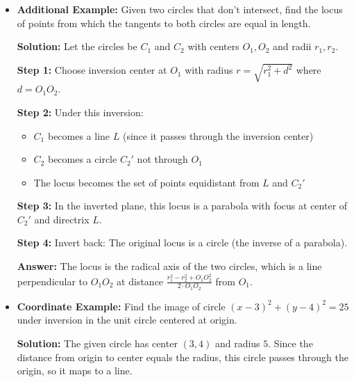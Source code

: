 \documentclass[12pt]{article}
\begin{document}
\begin{itemize}
    \textbf{Step 3:} In the inverted plane, we have two parallel lines distance $d$ apart with a circle of radius $r_3'$ between them. The circle tangent to both lines and $C_3'$ has radius $r_4' = \frac{d - 2r_3'}{2}$.
    
    \textbf{Step 4:} Invert back: $r_4 = \frac{r^2 \cdot r_4'}{d'^2}$ where $d'$ is the distance from $T$ to the center of the inverted circle.
    
    \textbf{Answer:} $r_4 = \frac{6}{23}$ (after detailed calculation of distances).
    
    \item \textbf{Additional Example:} Given two circles that don't intersect, find the locus of points from which the tangents to both circles are equal in length.
    
    \textbf{Solution:} Let the circles be $C_1$ and $C_2$ with centers $O_1, O_2$ and radii $r_1, r_2$.
    
    \textbf{Step 1:} Choose inversion center at $O_1$ with radius $r = \sqrt{r_1^2 + d^2}$ where $d = O_1O_2$.
    
    \textbf{Step 2:} Under this inversion:
    \begin{itemize}
        \item $C_1$ becomes a line $L$ (since it passes through the inversion center)
        \item $C_2$ becomes a circle $C_2'$ not through $O_1$
        \item The locus becomes the set of points equidistant from $L$ and $C_2'$
    \end{itemize}
    
    \textbf{Step 3:} In the inverted plane, this locus is a parabola with focus at center of $C_2'$ and directrix $L$.
    
    \textbf{Step 4:} Invert back: The original locus is a circle (the inverse of a parabola).
    
    \textbf{Answer:} The locus is the radical axis of the two circles, which is a line perpendicular to $O_1O_2$ at distance $\frac{r_1^2 - r_2^2 + O_1O_2^2}{2 \cdot O_1O_2}$ from $O_1$.
    
    \item \textbf{Coordinate Example:} Find the image of circle $(x-3)^2 + (y-4)^2 = 25$ under inversion in the unit circle centered at origin.
    
    \textbf{Solution:} The given circle has center $(3,4)$ and radius $5$. Since the distance from origin to center equals the radius, this circle passes through the origin, so it maps to a line.
    

\end{itemize}
\end{document}
